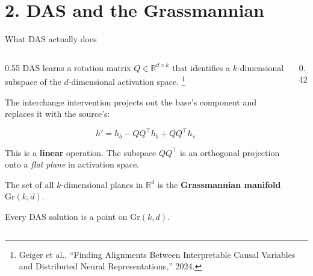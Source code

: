 \documentclass[aspectratio=169,11pt]{beamer}
\newcommand{\Gr}{\mathrm{Gr}}
\newcommand{\R}{\mathbb{R}}
\begin{document}
\section{2. DAS and the Grassmannian}

\begin{frame}{What DAS actually does}

\begin{columns}[T]
\begin{column}{0.55\textwidth}
{\small DAS learns a rotation matrix $Q \in \R^{d \times k}$ that identifies a $k$-dimensional subspace of the $d$-dimensional activation space.}%
\footnote{\tiny Geiger et al., ``Finding Alignments Between Interpretable Causal Variables and Distributed Neural Representations,'' 2024.}

\vspace{0.3em}
{\small The interchange intervention projects out the base's component and replaces it with the source's:}

$$h' = h_b - QQ^\top h_b + QQ^\top h_s$$

{\small This is a \textbf{linear} operation. The subspace $QQ^\top$ is an orthogonal projection onto a \emph{flat plane} in activation space.}

\vspace{0.3em}
{\small The set of all $k$-dimensional planes in $\R^d$ is the \textbf{Grassmannian manifold} $\Gr(k,d)$.}

\vspace{0.3em}
{\small Every DAS solution is a point on $\Gr(k,d)$.}
\end{column}
\begin{column}{0.42\textwidth}
\end{column}
\end{columns}
\end{frame}
\end{document}
